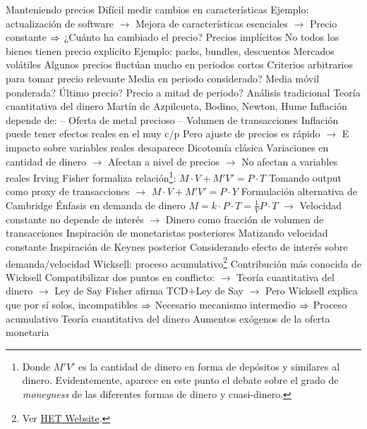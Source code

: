\documentclass{nuevotema}
\begin{document}
\begin{esquemal}
				\4[] Manteniendo precios
				\4 Difícil medir cambios en características
				\4[] Ejemplo: actualización de software
				\4[] $\to$ Mejora de características esenciales
				\4[] $\to$ Precio constante
				\4[] $\Rightarrow$ ¿Cuánto ha cambiado el precio?
			\3 Precios implícitos
				\4 No todos los bienes tienen precio explícito
				\4[] Ejemplo: packs, bundles, descuentos
			\3 Mercados volátiles
				\4 Algunos precios fluctúan mucho en periodos cortos
				\4 Criterios arbitrarios para tomar precio relevante
				\4[] Media en periodo considerado?
				\4[] Media móvil ponderada?
				\4[] Último precio?
				\4[] Precio a mitad de periodo?
	\1 
		\2 Análisis tradicional
			\3 Teoría cuantitativa del dinero
				\4 Martín de Azpilcueta, Bodino, Newton, Hume
				\4 Inflación depende de:
				\4[] -- Oferta de metal precioso
				\4[] -- Volumen de transacciones
				\4 Inflación puede tener efectos reales en el muy c/p
				\4[] Pero ajuste de precios es rápido
				\4[] $\to$ E impacto sobre variables reales desaparece
				\4 Dicotomía clásica
				\4[] Variaciones en cantidad de dinero
				\4[] $\to$ Afectan a nivel de precios
				\4[] $\to$ No afectan a variables reales
				\4 Irving Fisher formaliza relación\footnote{Donde $M' V'$ es la cantidad de dinero en forma de depósitos y similares al dinero. Evidentemente, aparece en este punto el debate sobre el grado de \textit{moneyness} de las diferentes formas de dinero y cuasi-dinero.}:
				\4[] $M \cdot V + M' V'= P \cdot T$
				\4[] Tomando output como proxy de transacciones
				\4[] $\to$ $M \cdot V + M' V' = P \cdot Y$
				\4 Formulación alternativa de Cambridge
				\4[] Énfasis en demanda de dinero
				\4[] $M = k\cdot P \cdot T = \frac{1}{V} P \cdot T$
				\4[] $\to$ Velocidad constante no depende de interés
				\4[] $\to$ Dinero como fracción de volumen de transacciones
				\4 Inspiración de monetaristas posteriores
				\4[] Matizando velocidad constante
				\4 Inspiración de Keynes posterior
				\4[] Considerando efecto de interés sobre demanda/velocidad
			\3 Wicksell: proceso acumulativo\footnote{Ver \href{https://www.hetwebsite.net/het/essays/money/cumulative.htm}{HET Website}.}
				\4 Contribución más conocida de Wicksell
				\4 Compatibilizar dos puntos en conflicto:
				\4[] $\to$ Teoría cuantitativa del dinero
				\4[] $\to$ Ley de Say
				\4[] Fisher afirma TCD+Ley de Say
				\4[] $\to$ Pero Wicksell explica que por sí solos, incompatibles
				\4[] $\Rightarrow$ Necesario mecanismo intermedio
				\4[] $\Rightarrow$ Proceso acumulativo
				\4 Teoría cuantitativa del dinero
				\4[] Aumentos exógenos de la oferta monetaria

\end{esquemal}
\end{document}
